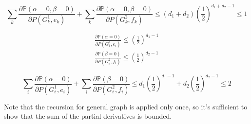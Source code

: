 	\begin{Cor}
		\[\sum_k \frac{\partial \mathbb{P}\left( \alpha = 0, \beta = 0 \right) }{ \partial P(G_k^1, e_k) } + \sum_k \frac{\partial \mathbb{P}\left( \alpha = 0, \beta = 0 \right) }{ \partial P(G_k^2, f_k) } \leq (d_1 + d_2) (\frac{1}{2})^{d_1+d_2-1} \leq 1\]
	\end{Cor}

	\begin{Prop}
		\begin{align*}
			\frac{\partial \mathbb{P}\left( \alpha = 0 \right) }{ \partial P(G_i^1, e_i) } \leq (\frac{1}{2})^{d_1 -1} \\
			\frac{\partial \mathbb{P}\left( \beta = 0 \right) }{ \partial P(G_i^2, f_i) } \leq (\frac{1}{2})^{d_2 -1} 
		\end{align*}
	\end{Prop}

	\begin{Cor}
		\[ 
			\sum_i \frac{\partial \mathbb{P}\left( \alpha = 0 \right) }{ \partial P(G_i^1, e_i) } +
			\sum_i \frac{\partial \mathbb{P}\left( \beta = 0 \right) }{ \partial P(G_i^2, f_i) } \leq
			d_1 \left( \frac{1}{2} \right)^{d_1-1} +d_2 \left( \frac{1}{2} \right)^{d_2-1} \leq
			2
		\]
	\end{Cor}

	Note that the recursion for general graph is applied only once, so it's sufficient to show that the sum of the partial derivatives is bounded.
